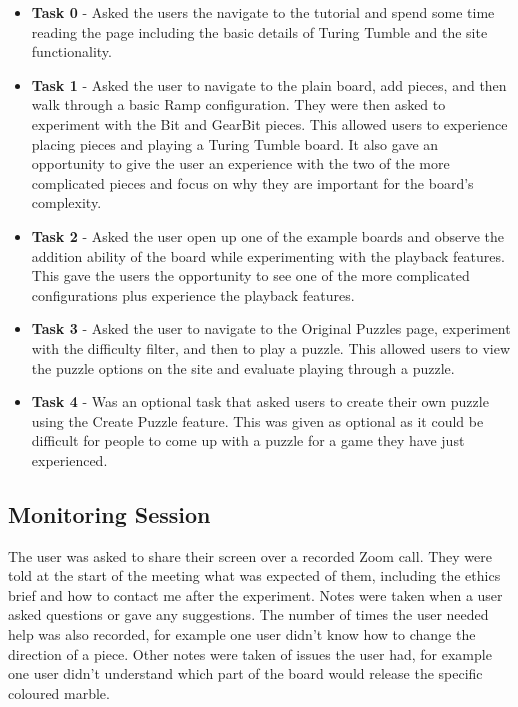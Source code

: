 \documentclass{l4proj}
\begin{document}
\begin{itemize}
    \item \textbf{Task 0} - Asked the users the navigate to the tutorial and spend some time reading the page including the basic details of Turing Tumble and the site functionality.
    \item \textbf{Task 1} - Asked the user to navigate to the plain board, add pieces, and then walk through a basic Ramp configuration. They were then asked to experiment with the Bit and GearBit pieces. This allowed users to experience placing pieces and playing a Turing Tumble board. It also gave an opportunity to give the user an experience with the two of the more complicated pieces and focus on why they are important for the board's complexity.
    \item \textbf{Task 2} - Asked the user open up one of the example boards and observe the addition ability of the board while experimenting with the playback features. This gave the users the opportunity to see one of the more complicated configurations plus experience the playback features.
    \item \textbf{Task 3} - Asked the user to navigate to the Original Puzzles page, experiment with the difficulty filter, and then to play a puzzle. This allowed users to view the puzzle options on the site and evaluate playing through a puzzle.
    \item \textbf{Task 4} - Was an optional task that asked users to create their own puzzle using the Create Puzzle feature. This was given as optional as it could be difficult for people to come up with a puzzle for a game they have just experienced.
\end{itemize}

\subsection{Monitoring Session}
The user was asked to share their screen over a recorded Zoom call. They were told at the start of the meeting what was expected of them, including the ethics brief and how to contact me after the experiment. Notes were taken when a user asked questions or gave any suggestions. The number of times the user needed help was also recorded, for example one user didn't know how to change the direction of a piece. Other notes were taken of issues the user had, for example one user didn't understand which part of the board would release the specific coloured marble.
\end{document}
